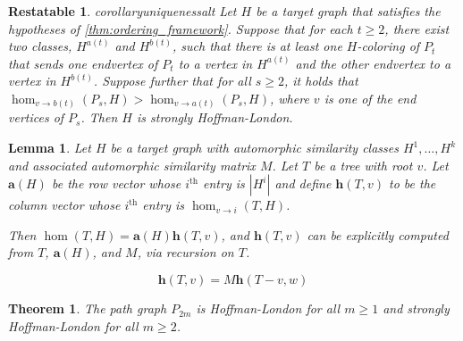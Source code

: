 \documentclass[10pt,a4paper]{amsart}
\newtheorem{restatable}{Restatable}
\newtheorem{lemma}{Lemma}
\newtheorem{theorem}{Theorem}
\newcommand{\homclass}[4]{\hom_{#1\to#2}(#3,#4)}
\newcommand{\ith}[1]{$#1^{\text{th}}$}
\begin{document}
\begin{restatable}{corollary}{uniquenessalt} \label{cor:uniquenessalt}
Let $H$ be a target graph that satisfies the hypotheses of \cref{thm:ordering_framework}. Suppose that for each $t \ge 2$, there exist two classes, $H^{a(t)}$ and $H^{b(t)}$, such that there is at least one $H$-coloring of $P_t$ that sends one endvertex of $P_t$ to a vertex in $H^{a(t)}$ and the other endvertex to a vertex in $H^{b(t)}$. Suppose further that for all $s \ge 2$, it holds that $\homclass{v}{b(t)}{P_s}{H} > \homclass{v}{a(t)}{P_s}{H}$, where $v$ is one of the end vertices of $P_s$. Then $H$ is strongly Hoffman-London. 
\end{restatable}

\begin{lemma} \label{lem:tree_walk}
Let $H$ be a target graph with automorphic similarity classes $H^1, \ldots, H^k$ and associated automorphic similarity matrix $M$. Let $T$ be a tree with root $v$.  Let $\mathbf{a}(H)$ be the row vector whose \ith{i} entry is $|H^i|$ and define $\mathbf{h}(T,v)$ to be the column vector whose \ith{i} entry is $\homclass{v}{i}{T}{H}$.

Then $\hom(T,H)={\mathbf a}(H) \mathbf{h}(T,v)$, and $\mathbf{h}(T,v)$ can be explicitly computed from $T$, $\mathbf{a}(H)$, and $M$, via recursion on $T$.
\end{lemma}

\begin{equation} \label{eq:treewalkalgorithm-pathcase} 
\mathbf{h}(T,v) = M \mathbf{h}(T-v,w)
\end{equation}

\begin{theorem} \label{thm:even_path_minimizer}
The path graph $P_{2m}$ is Hoffman-London for all $m \ge 1$ and strongly Hoffman-London for all $m \ge 2$.
\end{theorem}
\end{document}
